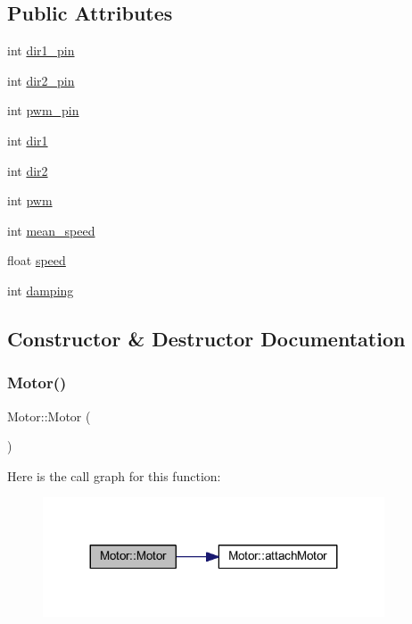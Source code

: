 \subsection*{Public Attributes}
\begin{DoxyCompactItemize}
\item 
int \hyperlink{class_motor_a73a58a00e5e1872c5ffec018fe975957}{dir1\+\_\+pin}
\item 
int \hyperlink{class_motor_adea12227392cb7a5ffe5e1878d870a9f}{dir2\+\_\+pin}
\item 
int \hyperlink{class_motor_a140443a1dcef9aef92dbfc5a8190b2a4}{pwm\+\_\+pin}
\item 
int \hyperlink{class_motor_abbca15c5ddfd452cd6a470710205afa0}{dir1}
\item 
int \hyperlink{class_motor_abb107a945dceecc4173bf7053ea8be07}{dir2}
\item 
int \hyperlink{class_motor_aef307daeabd4eee18f890b0df79c5b2b}{pwm}
\item 
int \hyperlink{class_motor_a6425f6db2380fbc7291d6866bef0b5d2}{mean\+\_\+speed}
\item 
float \hyperlink{class_motor_aee22669add18744bbddbd2bb267bce13}{speed}
\item 
int \hyperlink{class_motor_a330fe27cdd9c7fecdc1c5c7a35525f55}{damping}
\end{DoxyCompactItemize}


\subsection{Constructor \& Destructor Documentation}
\mbox{\label{class_motor_af6106b4c506411265c5face762b6c004}} 
\subsubsection{\texorpdfstring{Motor()}{Motor()}\hspace{0.1cm}{\footnotesize\ttfamily [1/2]}}
{\footnotesize\ttfamily Motor\+::\+Motor (\begin{DoxyParamCaption}{ }\end{DoxyParamCaption})}

Here is the call graph for this function\+:
\nopagebreak
\begin{figure}[H]
\begin{center}
\leavevmode
\includegraphics[width=287pt]{d1/d6b/class_motor_af6106b4c506411265c5face762b6c004_cgraph}
\end{center}
\end{figure}
\mbox{\label{class_motor_af7bad7a60264d47a368216d72704d838}} 
